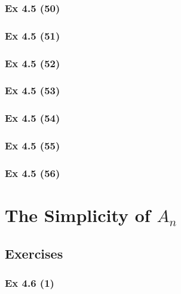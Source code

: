 \subsubsection{Ex 4.5 (50)}\label{sec:Ex_4.5.50}

\newpage		%

\subsubsection{Ex 4.5 (51)}\label{sec:Ex_4.5.51}

\subsubsection{Ex 4.5 (52)}\label{sec:Ex_4.5.52}

\subsubsection{Ex 4.5 (53)}\label{sec:Ex_4.5.53}

\subsubsection{Ex 4.5 (54)}\label{sec:Ex_4.5.54}

\subsubsection{Ex 4.5 (55)}\label{sec:Ex_4.5.55}

\subsubsection{Ex 4.5 (56)}\label{sec:Ex_4.5.56}

\newpage		%

\section{The Simplicity of $ A_n$}\label{sec:4.6}	
\subsection*{Exercises}\label{sec:4.6_Exercises}

\subsubsection{Ex 4.6 (1)}\label{sec:Ex_4.6.1}

